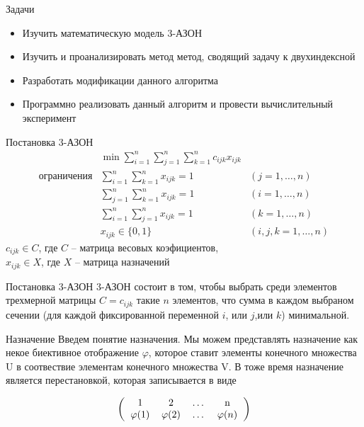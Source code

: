 \documentclass[12pt]{beamer}
\begin{document}
\begin{frame}{Задачи}
\begin{itemize}
\item Изучить математическую модель 3-АЗОН
\item Изучить и проанализировать метод метод, сводящий задачу к двухиндексной
\item Разработать модификации данного алгоритма
\item Программно реализовать данный алгоритм и провести вычислительный эксперимент
\end{itemize}
\end{frame}

\begin{frame}{Постановка 3-АЗОН}
\begin{eqnarray*}
  & \min \displaystyle \sum^n_{i = 1} \displaystyle \sum^n_{j = 1} \displaystyle \sum^n_{k = 1}
  c_{ijk} x_{ijk} \\
  \text{ограничения}
  &\displaystyle \sum^n_{i = 1} \displaystyle \sum^n_{k = 1} x_{ijk} = 1  &(j = 1, \ldots, n) \\
  &\displaystyle \sum^n_{j = 1} \displaystyle \sum^n_{k = 1} x_{ijk} = 1  &(i = 1, \ldots, n) \\
  &\displaystyle \sum^n_{i = 1} \displaystyle \sum^n_{j = 1} x_{ijk} = 1  &(k = 1, \ldots, n) \\
  & x_{ijk} \in \{ 0, 1 \} &(i,j,k = 1, \ldots, n)
\end{eqnarray*}
$c_{ijk} \in C$, где $C$ -- матрица весовых коэфициентов, \\
$x_{ijk} \in X$, где $X$ -- матрица назначений
\end{frame}


\begin{frame}{Постановка 3-АЗОН}
3-АЗОН состоит в том, чтобы выбрать среди элементов трехмерной матрицы $C={c_{ijk}}$ такие $n$ элементов, что сумма в каждом выбраном сечении (для каждой фиксированной переменной $i$, или $j$,или $k$) минимальной. 
\end{frame}

\begin{frame}{Назначение}
Введем понятие назначения. Мы можем
представлять назначение как некое биективное отображение $\varphi$, которое ставит
элементы конечного множества $\mathrm{U}$ в соотвествие элементам конечного
множества $\mathrm{V}$. В тоже время назначение является перестановкой, которая записывается
в виде

\[
\left (
  \begin{tabular}{cccc}
  1 & 2 & \ldots & n\\
  $\varphi (1)$ & $\varphi (2)$ & \ldots & $\varphi (n)$
  \end{tabular}
\right )
\]
\end{frame} 
\end{document}
